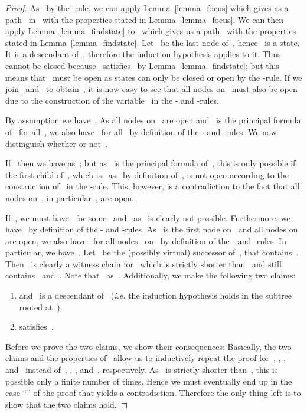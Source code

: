 \documentclass{entcs}
\newcommand{\ie}{\emph{i.e.}}
\newcommand{\trero}{}
\newcommand{\trea}{}
\begin{document}
\begin{center}
\begin{proof}
  As~ by the \trea{}-rule,
  we can apply Lemma~\ref{lemma_focus}
  which gives as a path~ in~
  with the properties stated in Lemma~\ref{lemma_focus}.
  We can then apply Lemma~\ref{lemma_findstate} to~
  which gives us a path~ with the properties stated in Lemma~\ref{lemma_findstate}.
  Let~ be the last node of~, hence~ is a state.
  It is a descendant of~,
  therefore the induction hypothesis applies to it.
  Thus~ cannot be closed because~ satisfies~ by Lemma~\ref{lemma_findstate};
  but this means that~ must be open 
  as states can only be closed or open by the \trea{}-rule.
  If we join~ and~ to obtain~,
  it is now easy to see that all nodes on~ must also be open 
  due to the construction of the variable~ in the - and -rules.

  By assumption we have~.
  As all nodes on~ are open
  and~ is the principal formula of~ for all~,
  we also have~ for all~
  by definition of the - and -rules.
  We now distinguish whether or not~.

  If~ then we have 
  as~;
  but as~ is the principal formula of~,
  this is only possible if the first child of~,
  which is~ as~ by definition of~, is not open
  according to the construction of~ in the \trero{}-rule.
  This, however, is a contradiction to the fact that all nodes on~,
  in particular~, are open.

  If~, we must have~ for some~ and~
  as~ is clearly not possible.
  Furthermore, we have~
  by definition of the - and -rules.
  As~ is the first node on~ 
  and all nodes on~ are open,
  we also have~ for all nodes~ on~
  by definition of the - and -rules.
  In particular, we have~.
  Let~ be the (possibly virtual) successor of~,
  that contains~.
  Then~ is clearly 
  a witness chain for~
  which is strictly shorter than~
  and still contains~ and~.
  Note that~ as~.
  Additionally, we make the following two claims:
  \begin{enumerate}
  \item  
    and~ is a descendant of~
    (\ie{} the induction hypothesis holds in the subtree rooted at~).
  \item  satisfies~.
  \end{enumerate}
  Before we prove the two claims, we show their consequences:
  Basically, the two claims and the properties of~ allow us
  to inductively repeat the proof
  for~, , , and~ instead of~, , , and~, respectively.
  As~ is strictly shorter than~,
  this is possible only a finite number of times.
  Hence we must eventually end up in the case ``'' of the proof
  that yields a contradiction.
  Therefore the only thing left is to show that the two claims hold.


\end{proof}
\end{center}
\end{document}
